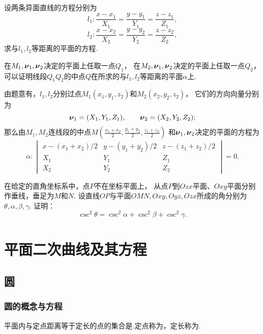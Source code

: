 \begin{example}
设两条异面直线的方程分别为\[
	l_1: \frac{x-x_1}{X_1} = \frac{y-y_1}{Y_1} = \frac{z-z_1}{Z_1},
\]\[
	l_2: \frac{x-x_2}{X_2} = \frac{y-y_2}{Y_2} = \frac{z-z_2}{Z_2},
\]
求与\(l_1,l_2\)等距离的平面的方程.
\begin{solution}
在\(M_1,\boldsymbol{\nu}_1,\boldsymbol{\nu}_2\)决定的平面上任取一点\(Q_1\)，
在\(M_2,\boldsymbol{\nu}_1,\boldsymbol{\nu}_2\)决定的平面上任取一点\(Q_2\)，
可以证明线段\(Q_1 Q_2\)的中点\(Q\)在所求的与\(l_1,l_2\)等距离的平面\(\alpha\)上.

由题意有，\(l_1,l_2\)分别过点\(M_1(x_1,y_1,z_2)\)和\(M_2(x_2,y_2,z_2)\)，
它们的方向向量分别为\[
	\boldsymbol{\nu}_1 = (X_1,Y_1,Z_1), \qquad
	\boldsymbol{\nu}_2 = (X_2,Y_2,Z_2);
\]
那么由\(M_1,M_2\)连线段的中点\(M\left(
	\frac{x_1+x_2}{2},
	\frac{y_1+y_2}{2},
	\frac{z_1+z_2}{2}
\right)\)
和\(\boldsymbol{\nu}_1,\boldsymbol{\nu}_2\)决定的平面的方程为\[
	\alpha: \begin{vmatrix}
		x - (x_1+x_2)/2 & y - (y_1+y_2)/2 & z - (z_1+z_2)/2 \\
		X_1 & Y_1 & Z_1 \\
		X_2 & Y_2 & Z_2
	\end{vmatrix} = 0.
\]
\end{solution}
\end{example}

\begin{example}
在给定的直角坐标系中，点\(P\)不在坐标平面上，
从点\(P\)到\(Ozx\)平面、\(Oxy\)平面分别作垂线，垂足为\(M\)和\(N\).
设直线\(OP\)与平面\(OMN,Oxy,Oyz,Ozx\)所成的角分别为\(\theta,\alpha,\beta,\gamma\).
证明：\[
	\csc^2\theta = \csc^2\alpha+\csc^2\beta+\csc^2\gamma.
\]
\end{example}

\section{平面二次曲线及其方程}
\subsection{圆}
\subsubsection{圆的概念与方程}
\begin{definition}
平面内与定点距离等于定长的点的集合是.定点称为，定长称为.
\end{definition}

